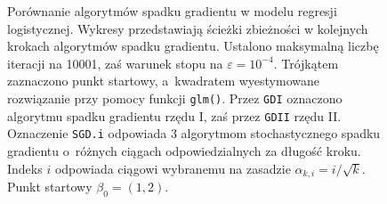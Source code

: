 \begin{figure}[hbt!]
  \caption[Porównanie algorytmów spadku gradientu dla punktu startowego $\beta_0 = (1,2)$.]{\label{fig:sc2asd}Porównanie algorytmów spadku gradientu w modelu regresji logistycznej. Wykresy przedstawiają ścieżki zbieżności w kolejnych krokach algorytmów spadku gradientu. Ustalono maksymalną liczbę iteracji na 10001, zaś warunek stopu na $\varepsilon=10^{-4}$. Trójkątem zaznaczono punkt startowy, a~kwadratem wyestymowane rozwiązanie przy pomocy funkcji \texttt{glm()}. Przez \texttt{GDI} oznaczono algorytmu spadku gradientu rzędu I, zaś przez \texttt{GDII} rzędu II. Oznaczenie \texttt{SGD.i} odpowiada 3 algorytmom stochastycznego spadku gradientu o~różnych ciągach odpowiedzialnych za długość kroku. Indeks $i$ odpowiada ciągowi wybranemu na zasadzie $\alpha_{k,i} = i/\sqrt{k}$. Punkt startowy $\beta_0 = (1,2)$.}
\end{figure}


